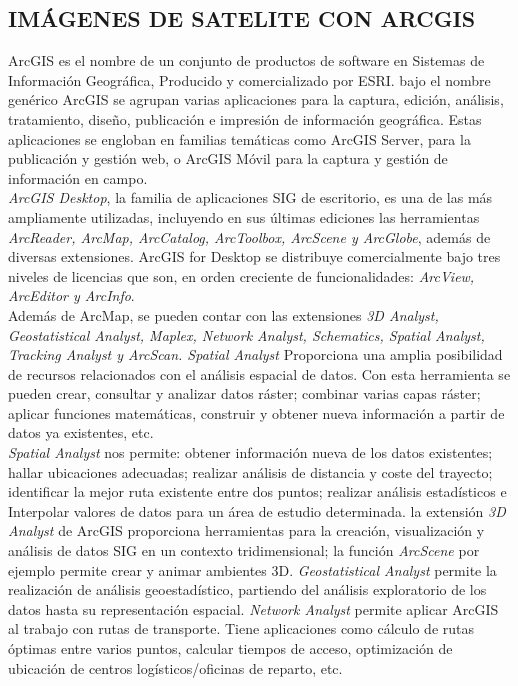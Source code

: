 \documentclass[a4paper,oneside,11pt,]{article}
\begin{document}
\subsection{IMÁGENES DE SATELITE CON ARCGIS}
ArcGIS es el nombre de un conjunto de productos de software en Sistemas de Información Geográfica, Producido y comercializado por ESRI. bajo el nombre genérico ArcGIS se agrupan varias aplicaciones para la captura, edición, análisis, tratamiento, diseño, publicación e impresión de información geográfica. Estas aplicaciones se engloban en familias temáticas como ArcGIS Server, para la publicación y gestión web, o ArcGIS Móvil para la captura y gestión de información en campo.\\
\emph{ArcGIS Desktop}, la familia de aplicaciones SIG de escritorio, es una de las más ampliamente utilizadas, incluyendo en sus últimas ediciones las herramientas \emph{ArcReader, ArcMap, ArcCatalog, ArcToolbox, ArcScene y ArcGlobe}, además de diversas extensiones. ArcGIS for Desktop se distribuye comercialmente bajo tres niveles de licencias que son, en orden creciente de funcionalidades: \emph{ArcView, ArcEditor y ArcInfo}.\\ 
Además de ArcMap, se pueden contar con las extensiones \emph{3D Analyst, Geostatistical Analyst, Maplex, Network Analyst, Schematics, Spatial Analyst, Tracking Analyst y ArcScan. Spatial Analyst} Proporciona una amplia posibilidad de recursos relacionados con el análisis espacial de datos. Con esta herramienta se pueden crear, consultar y analizar datos ráster; combinar varias capas ráster; aplicar funciones matemáticas, construir y obtener nueva información a partir de datos ya existentes, etc. \\
\emph{Spatial Analyst} nos permite: obtener información nueva de los datos existentes; hallar ubicaciones adecuadas; realizar análisis de distancia y coste del trayecto; identificar la mejor ruta existente entre dos puntos; realizar análisis estadísticos e Interpolar valores de datos para un área de estudio determinada. la extensión \emph{3D Analyst} de ArcGIS proporciona herramientas para la creación, visualización y análisis de datos SIG en un contexto tridimensional; la función \emph{ArcScene} por ejemplo permite crear y animar ambientes 3D. \emph{Geostatistical Analyst} permite la realización de análisis geoestadístico, partiendo del análisis exploratorio de los datos hasta su representación espacial. \emph{Network Analyst} permite aplicar ArcGIS al trabajo con rutas de transporte. Tiene aplicaciones como cálculo de rutas óptimas entre varios puntos, calcular tiempos de acceso, optimización de ubicación de centros logísticos/oficinas de reparto, etc.
\end{document}
